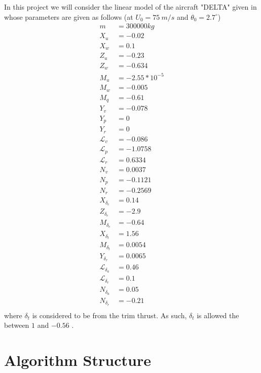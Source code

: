 \documentclass{article}
\begin{document}
In this project we will consider the linear model of the aircraft "DELTA" given in \cite[PP. 561--563]{Mclean}
whose parameters are given as follows (at $U_0 = 75~ m/s$ and $\theta_0 = 2.7 ^\circ$)
\begin{equation}\label{Eq:DELTA_Params}
    \begin{split}
        m &= 300000 kg\\
        X_u &= -0.02\\
        X_w &= 0.1\\
        Z_u &= -0.23\\
        Z_w &= -0.634\\
        M_u &= -2.55*10^{-5}\\
        M_w &= -0.005\\
        M_q &= -0.61\\
        Y_v &= -0.078\\
        Y_p &= 0\\
        Y_r &= 0\\
        \mathcal{L}_v &= -0.086\\
        \mathcal{L}_p &= -1.0758\\
        \mathcal{L}_r &= 0.6334\\
        N_v &= 0.0037\\
        N_p &= -0.1121\\
        N_r &= -0.2569\\
        X_{\delta_e} &= 0.14\\
        Z_{\delta_e} &= -2.9\\
        M_{\delta_e} &= -0.64\\
        X_{\delta_t} &= 1.56\\
        M_{\delta_t} &= 0.0054\\
        Y_{\delta_r} &= 0.0065\\
        \mathcal{L}_{\delta_a} &= 0.46\\
        \mathcal{L}_{\delta_r} &= 0.1\\
        N_{\delta_a} &= 0.05\\
        N_{\delta_r} &= -0.21\\
    \end{split}
\end{equation}
where $\delta_t$ is considered to be from the trim thrust. 
As such, $\delta_t$ is allowed the between $1$ and $-0.56$ \cite{Hassan2016_JAST}.

\section{Algorithm Structure}
\end{document}
